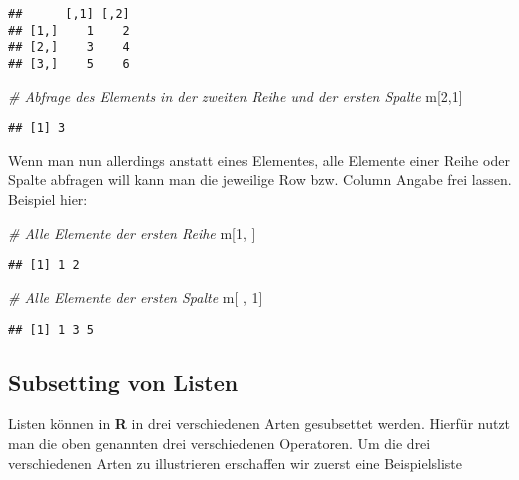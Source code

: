 \documentclass[
]{book}
\newenvironment{Shaded}{\begin{snugshade}}{\end{snugshade}}
\newcommand{\CommentTok}[1]{\textcolor[rgb]{0.56,0.35,0.01}{\textit{#1}}}
\newcommand{\DecValTok}[1]{\textcolor[rgb]{0.00,0.00,0.81}{#1}}
\newcommand{\NormalTok}[1]{#1}
\begin{document}
\begin{verbatim}
##      [,1] [,2]
## [1,]    1    2
## [2,]    3    4
## [3,]    5    6
\end{verbatim}

\begin{Shaded}
\begin{Highlighting}[]
\CommentTok{# Abfrage des Elements in der zweiten Reihe und der ersten Spalte}
\NormalTok{m[}\DecValTok{2}\NormalTok{,}\DecValTok{1}\NormalTok{]}
\end{Highlighting}
\end{Shaded}

\begin{verbatim}
## [1] 3
\end{verbatim}

Wenn man nun allerdings anstatt eines Elementes, alle Elemente einer Reihe oder Spalte abfragen will kann
man die jeweilige Row bzw. Column Angabe frei lassen. Beispiel hier:

\begin{Shaded}
\begin{Highlighting}[]
\CommentTok{# Alle Elemente der ersten Reihe}
\NormalTok{m[}\DecValTok{1}\NormalTok{, ]}
\end{Highlighting}
\end{Shaded}

\begin{verbatim}
## [1] 1 2
\end{verbatim}

\begin{Shaded}
\begin{Highlighting}[]
\CommentTok{# Alle Elemente der ersten Spalte}
\NormalTok{m[ , }\DecValTok{1}\NormalTok{]}
\end{Highlighting}
\end{Shaded}

\begin{verbatim}
## [1] 1 3 5
\end{verbatim}

\hypertarget{subsetting-von-listen}{%
\subsection{Subsetting von Listen}\label{subsetting-von-listen}}

Listen können in \textbf{R} in drei verschiedenen Arten gesubsettet werden. Hierfür nutzt man die oben genannten drei verschiedenen Operatoren. Um die drei verschiedenen Arten zu illustrieren erschaffen wir zuerst eine Beispielsliste
\end{document}
